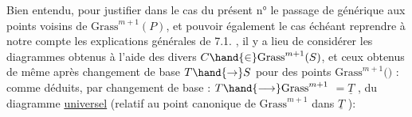 
Bien entendu, pour justifier dans le cas  du présent n° le passage
de \hand{$\eta$} générique aux points voisins de $\mathrm{Grass}^{m+1}(P)$, et pouvoir également
le cas échéant reprendre à notre compte les explications générales de
7.1. , il y a lieu de considérer les diagrammes
obtenus à l'aide des divers $C \hand{\in} \mathrm{Grass}^{m+1}(S)$, et  ceux obtenus de même
après changement de base $T \hand{\to} S$ pour des points \hand{$\unsure{\xi|\zeta}$} \hand{$\in$} $\mathrm{Grass}^{m+1}($$)$ :
\diagram{\[\begin{array}{ccc}
X_T & \hand{\longleftarrow} & \overset{\hand{\sim}}{X}(C_{\hand{\unsure{\xi|\zeta}}}) = \overset{\hand{\sim}}{X}_T(C_{\hand{\unsure{\xi|\zeta}}}) \\
\hand{\downarrow} & & \hand{\downarrow} \\
T & \hand{\longleftarrow} & \hand{Q}(C_{\hand{\unsure{\xi|\zeta}}})
\end{array}\]}
comme déduits, par changement de base \hand{$\unsure{\xi|\zeta}$} : $T \hand{\longrightarrow} \mathrm{Grass}^{m+1}$ $= \underline{T}$ ,
du diagramme \uline{universel} (relatif au point canonique de $\mathrm{Grass}^{m+1}$ dans $\underline{T}$ ):

